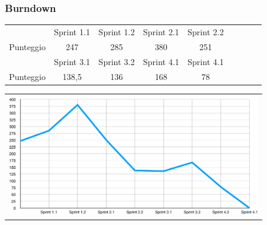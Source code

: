 \documentclass{beamer}
\begin{document}

\begin{frame}
\frametitle{Burndown}
\centering
\begin{tabular}{|c|c|c|c|c|c|c|c|c|}
\hline
					& Sprint 1.1	& Sprint 1.2	&Sprint 2.1	&Sprint 2.2	\\
Punteggio		& 247			& 285			& 380			& 251			\\
\hline
					&Sprint 3.1	&Sprint 3.2	&Sprint 4.1	&Sprint 4.1    \\
Punteggio 	& 138,5			& 136			& 168			& 78 			 	 \\
\hline
\end{tabular}
 \centering
        \begin{tabular}{c}
        \includegraphics[width=11cm]{burndown/burndown_slides.png}
      \end{tabular}
\end{frame}
\end{document}
